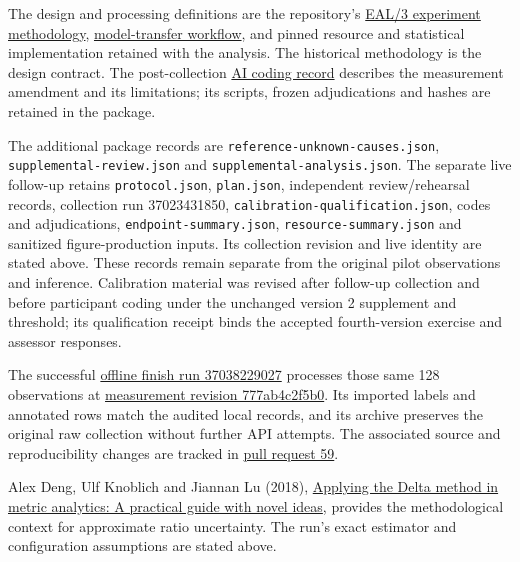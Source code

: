 \documentclass[preprint,11pt]{elsarticle}
\begin{document}
The design and processing definitions are the repository's
\href{https://github.com/emmett08/earl/blob/c0974bc6bb6a2df30d1423b6248bfc51b4d2a9d7/docs/eal3-experiment-methodology.md}{EAL/3
experiment methodology},
\href{https://github.com/emmett08/earl/blob/c0974bc6bb6a2df30d1423b6248bfc51b4d2a9d7/experiments/model_transfer/WORKFLOW.md}{model-transfer
workflow}, and pinned resource and statistical implementation retained
with the analysis. The historical methodology is the design contract.
The post-collection
\href{https://github.com/emmett08/earl/blob/cea2b59e686d57e0c071924f184b497919ec91a7/annotations/pilot-36985062352-AI-CODING.md}{AI
coding record} describes the measurement amendment and its limitations;
its scripts, frozen adjudications and hashes are retained in the
package.

The additional package records are
\texttt{reference-\allowbreak{}unknown-\allowbreak{}causes.json},
\texttt{supplemental-\allowbreak{}review.json} and
\texttt{supplemental-\allowbreak{}analysis.json}. The separate live follow-up retains
\texttt{protocol.json}, \texttt{plan.json}, independent review/rehearsal
records, collection run 37023431850,
\texttt{calibration-\allowbreak{}qualification.json}, codes and adjudications,
\texttt{endpoint-\allowbreak{}summary.json}, \texttt{resource-\allowbreak{}summary.json} and
sanitized figure-production inputs. Its collection revision and live
identity are stated above. These records remain separate from the
original pilot observations and inference. Calibration material was
revised after follow-up collection and before participant coding under
the unchanged version 2 supplement and threshold; its qualification
receipt binds the accepted fourth-version exercise and assessor
responses.

The successful
\href{https://github.com/emmett08/earl/actions/runs/37038229027}{offline
finish run 37038229027} processes those same 128 observations at
\href{https://github.com/emmett08/earl/commit/777ab4c2f5b0ed2165d662992db0413d82dde14a}{measurement
revision 777ab4c2f5b0}. Its imported labels and annotated rows match the
audited local records, and its archive preserves the original raw
collection without further API attempts. The associated source and
reproducibility changes are tracked in
\href{https://github.com/emmett08/earl/pull/59}{pull request 59}.

Alex Deng, Ulf Knoblich and Jiannan Lu (2018),
\href{https://arxiv.org/abs/1803.06336}{Applying the Delta method in
metric analytics: A practical guide with novel ideas}, provides the
methodological context for approximate ratio uncertainty. The run's
exact estimator and configuration assumptions are stated above.
\end{document}
